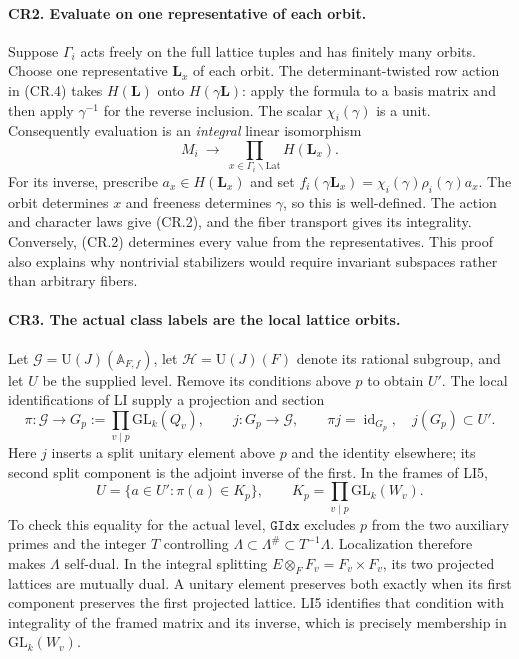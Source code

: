 \paragraph{CR2. Evaluate on one representative of each orbit.}
Suppose $\Gamma_i$ acts freely on the full lattice tuples and has finitely
many orbits. Choose one representative $\mathbf L_x$ of each orbit.
The determinant-twisted row action in (CR.4) takes
$H(\mathbf L)$ onto $H(\gamma\mathbf L)$: apply the formula to a
basis matrix and then apply $\gamma^{-1}$ for the reverse inclusion.
The scalar $\chi_i(\gamma)$ is a unit. Consequently evaluation is an
\emph{integral} linear isomorphism
\[
 M_i\ \longrightarrow\ \prod_{x\in\Gamma_i\backslash\mathrm{Lat}}
                                  H(\mathbf L_x).       \tag{CR.6}
\]
For its inverse, prescribe $a_x\in H(\mathbf L_x)$ and set
$f_i(\gamma\mathbf L_x)=\chi_i(\gamma)\rho_i(\gamma)a_x$.
The orbit determines $x$ and freeness determines $\gamma$, so this
is well-defined. The action and character laws give (CR.2), and the
fiber transport gives its integrality. Conversely, (CR.2) determines
every value from the representatives. This proof also explains why
nontrivial stabilizers would require invariant subspaces rather than
arbitrary fibers.

\paragraph{CR3. The actual class labels are the local lattice orbits.}
Let $\mathcal G=\mathrm U(J)(\mathbb A_{F,f})$, let
$\mathcal H=\mathrm U(J)(F)$ denote its rational subgroup, and let
$U$ be the supplied level. Remove its conditions above $p$ to obtain
$U'$. The local identifications of LI supply a projection and section
\[
 \pi:\mathcal G\longrightarrow
       G_p:=\prod_{v\mid p}\mathrm{GL}_k(Q_v),\qquad
 j:G_p\longrightarrow\mathcal G,
 \qquad \pi j=\operatorname{id}_{G_p},\quad j(G_p)\subset U'.
\]
Here $j$ inserts a split unitary element above $p$ and the identity
elsewhere; its second split component is the adjoint inverse of the
first. In the frames of LI5,
\[
 U=\{a\in U':\pi(a)\in K_p\},
       \qquad K_p=\prod_{v\mid p}\mathrm{GL}_k(W_v).
                                                               \tag{CR.7}
\]
To check this equality for the actual level, $\texttt{GIdx}$ excludes
$p$ from the two auxiliary primes and the integer $T$ controlling
$\Lambda\subset\Lambda^{\#}\subset T^{-1}\Lambda$.
Localization therefore makes $\Lambda$ self-dual. In the integral
splitting $E\otimes_F F_v=F_v\times F_v$, its two projected lattices
are mutually dual. A unitary element preserves both exactly when its
first component preserves the first projected lattice. LI5 identifies
that condition with integrality of the framed matrix and its inverse,
which is precisely membership in $\mathrm{GL}_k(W_v)$.

